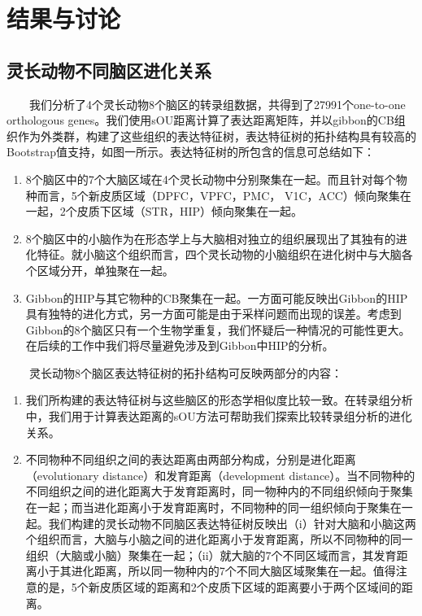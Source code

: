 \documentclass[hyperref,]{ctexart}
\providecommand{\tightlist}{%
  \setlength{\itemsep}{0pt}\setlength{\parskip}{0pt}}
\begin{document}
\section{结果与讨论}

\subsection{灵长动物不同脑区进化关系}

  我们分析了4个灵长动物8个脑区的转录组数据，共得到了27991个one-to-one
orthologous
genes。我们使用sOU距离计算了表达距离矩阵，并以gibbon的CB组织作为外类群，构建了这些组织的表达特征树，表达特征树的拓扑结构具有较高的Bootstrap值支持，如图一所示。表达特征树的所包含的信息可总结如下：

\begin{enumerate}
\def\labelenumi{\arabic{enumi}.}
\tightlist
\item
  8个脑区中的7个大脑区域在4个灵长动物中分别聚集在一起。而且针对每个物种而言，5个新皮质区域（DPFC，VPFC，PMC，
  V1C，ACC）倾向聚集在一起，2个皮质下区域（STR，HIP）倾向聚集在一起。
\item
  8个脑区中的小脑作为在形态学上与大脑相对独立的组织展现出了其独有的进化特征。就小脑这个组织而言，四个灵长动物的小脑组织在进化树中与大脑各个区域分开，单独聚在一起。
\item
  Gibbon的HIP与其它物种的CB聚集在一起。一方面可能反映出Gibbon的HIP具有独特的进化方式，另一方面可能是由于采样问题而出现的误差。考虑到Gibbon的8个脑区只有一个生物学重复，我们怀疑后一种情况的可能性更大。在后续的工作中我们将尽量避免涉及到Gibbon中HIP的分析。
\end{enumerate}

  灵长动物8个脑区表达特征树的拓扑结构可反映两部分的内容：

\begin{enumerate}
\def\labelenumi{\arabic{enumi}.}
\tightlist
\item
  我们所构建的表达特征树与这些脑区的形态学相似度比较一致。在转录组分析中，我们用于计算表达距离的sOU方法可帮助我们探索比较转录组分析的进化关系。
\item
  不同物种不同组织之间的表达距离由两部分构成，分别是进化距离（evolutionary
  distance）和发育距离（development
  distance）。当不同物种的不同组织之间的进化距离大于发育距离时，同一物种内的不同组织倾向于聚集在一起；而当进化距离小于发育距离时，不同物种的同一组织倾向于聚集在一起。我们构建的灵长动物不同脑区表达特征树反映出（i）针对大脑和小脑这两个组织而言，大脑与小脑之间的进化距离小于发育距离，所以不同物种的同一组织（大脑或小脑）聚集在一起；（ii）就大脑的7个不同区域而言，其发育距离小于其进化距离，所以同一物种内的7个不同大脑区域聚集在一起。值得注意的是，5个新皮质区域的距离和2个皮质下区域的距离要小于两个区域间的距离。
\end{enumerate}
\end{document}
